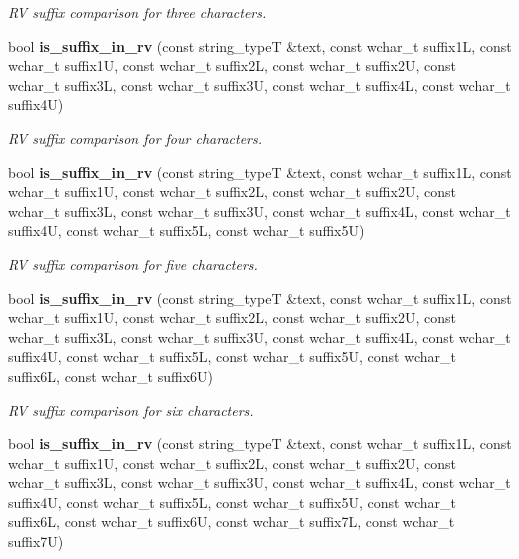 \begin{DoxyCompactItemize}
\begin{DoxyCompactList}\small\item\em RV suffix comparison for three characters. \end{DoxyCompactList}\item 
bool {\bf is\+\_\+suffix\+\_\+in\+\_\+rv} (const string\+\_\+typeT \&text, const wchar\+\_\+t suffix1L, const wchar\+\_\+t suffix1U, const wchar\+\_\+t suffix2L, const wchar\+\_\+t suffix2U, const wchar\+\_\+t suffix3L, const wchar\+\_\+t suffix3U, const wchar\+\_\+t suffix4L, const wchar\+\_\+t suffix4U)\label{classstemming_1_1stem_acdaff4e73f7f3841beed04775b5d4f21}

\begin{DoxyCompactList}\small\item\em RV suffix comparison for four characters. \end{DoxyCompactList}\item 
bool {\bf is\+\_\+suffix\+\_\+in\+\_\+rv} (const string\+\_\+typeT \&text, const wchar\+\_\+t suffix1L, const wchar\+\_\+t suffix1U, const wchar\+\_\+t suffix2L, const wchar\+\_\+t suffix2U, const wchar\+\_\+t suffix3L, const wchar\+\_\+t suffix3U, const wchar\+\_\+t suffix4L, const wchar\+\_\+t suffix4U, const wchar\+\_\+t suffix5L, const wchar\+\_\+t suffix5U)\label{classstemming_1_1stem_a99ef9b0e80da18c39cc0206a666bd4b1}

\begin{DoxyCompactList}\small\item\em RV suffix comparison for five characters. \end{DoxyCompactList}\item 
bool {\bf is\+\_\+suffix\+\_\+in\+\_\+rv} (const string\+\_\+typeT \&text, const wchar\+\_\+t suffix1L, const wchar\+\_\+t suffix1U, const wchar\+\_\+t suffix2L, const wchar\+\_\+t suffix2U, const wchar\+\_\+t suffix3L, const wchar\+\_\+t suffix3U, const wchar\+\_\+t suffix4L, const wchar\+\_\+t suffix4U, const wchar\+\_\+t suffix5L, const wchar\+\_\+t suffix5U, const wchar\+\_\+t suffix6L, const wchar\+\_\+t suffix6U)\label{classstemming_1_1stem_a527b081fee02f191713a50dbc396f986}

\begin{DoxyCompactList}\small\item\em RV suffix comparison for six characters. \end{DoxyCompactList}\item 
bool {\bf is\+\_\+suffix\+\_\+in\+\_\+rv} (const string\+\_\+typeT \&text, const wchar\+\_\+t suffix1L, const wchar\+\_\+t suffix1U, const wchar\+\_\+t suffix2L, const wchar\+\_\+t suffix2U, const wchar\+\_\+t suffix3L, const wchar\+\_\+t suffix3U, const wchar\+\_\+t suffix4L, const wchar\+\_\+t suffix4U, const wchar\+\_\+t suffix5L, const wchar\+\_\+t suffix5U, const wchar\+\_\+t suffix6L, const wchar\+\_\+t suffix6U, const wchar\+\_\+t suffix7L, const wchar\+\_\+t suffix7U)\label{classstemming_1_1stem_abd6431b54fc5175c29809c627c44a587}


\end{DoxyCompactItemize}
